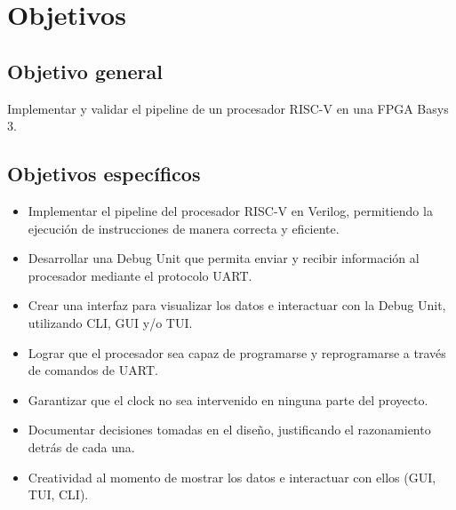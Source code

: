 \section{Objetivos}

\subsection{Objetivo general}
Implementar y validar el pipeline de un procesador RISC-V en una FPGA Basys 3.

\subsection{Objetivos específicos}
\begin{itemize}
    \item Implementar el pipeline del procesador RISC-V en Verilog, permitiendo la ejecución de instrucciones de manera correcta y eficiente.
    \item Desarrollar una Debug Unit que permita enviar y recibir información al procesador mediante el protocolo UART.
    \item Crear una interfaz para visualizar los datos e interactuar con la Debug Unit, utilizando CLI, GUI y/o TUI.
    \item Lograr que el procesador sea capaz de programarse y reprogramarse a través de comandos de UART.
    \item Garantizar que el clock no sea intervenido en ninguna parte del proyecto.
    \item Documentar decisiones tomadas en el diseño, justificando el razonamiento detrás de cada una.
    \item Creatividad al momento de mostrar los datos e interactuar con ellos (GUI, TUI, CLI).
\end{itemize}
